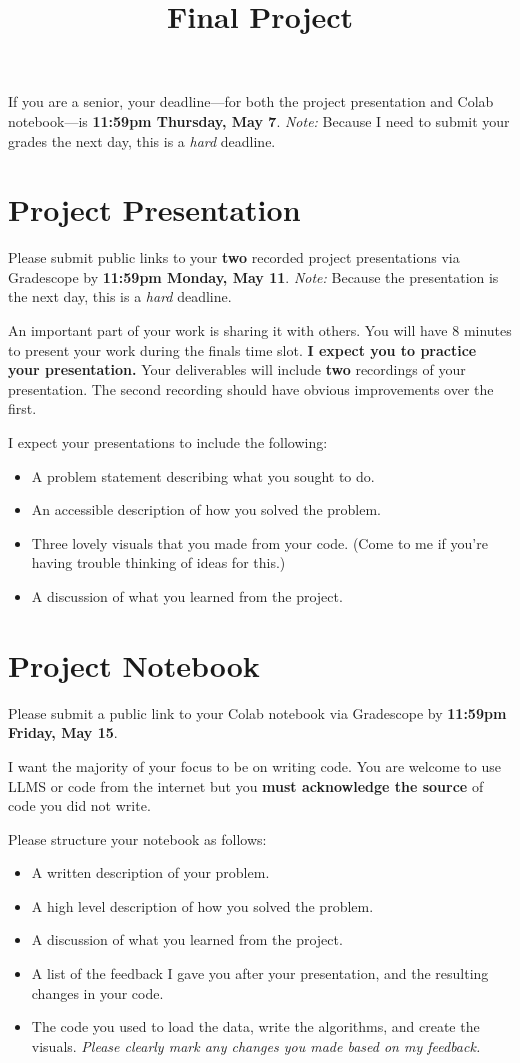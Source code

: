 \documentclass{article}
\title{Final Project}
\date{}
\begin{document}
\maketitle

\noindent If you are a senior, your deadline---for both the project presentation and Colab notebook---is \textbf{11:59pm Thursday, May 7}. \textit{Note:} Because I need to submit your grades the next day, this is a \textit{hard} deadline.

\section{Project Presentation}
Please submit public links to your \textbf{two} recorded project presentations via Gradescope by \textbf{11:59pm Monday, May 11}. \textit{Note:} Because the presentation is the next day, this is a \textit{hard} deadline. 

An important part of your work is sharing it with others.
You will have 8 minutes to present your work during the finals time slot.
\textbf{I expect you to practice your presentation.}
Your deliverables will include \textbf{two} recordings of your presentation.
The second recording should have obvious improvements over the first.

I expect your presentations to include the following:
\begin{itemize}
    \item A problem statement describing what you sought to do.
    \item An accessible description of how you solved the problem.
    \item Three lovely visuals that you made from your code.
    (Come to me if you're having trouble thinking of ideas for this.)
    \item A discussion of what you learned from the project.
\end{itemize}

\section{Project Notebook}
Please submit a public link to your Colab notebook via Gradescope by \textbf{11:59pm Friday, May 15}.

I want the majority of your focus to be on writing code.
You are welcome to use LLMS or code from the internet but you \textbf{must acknowledge the source} of code you did not write.

Please structure your notebook as follows:
\begin{itemize}
    \item A written description of your problem.
    \item A high level description of how you solved the problem.
    \item A discussion of what you learned from the project.
    \item A list of the feedback I gave you after your presentation, and the resulting changes in your code.
    \item The code you used to load the data, write the algorithms, and create the visuals.
    \textit{Please clearly mark any changes you made based on my feedback.}
\end{itemize}
\end{document}
